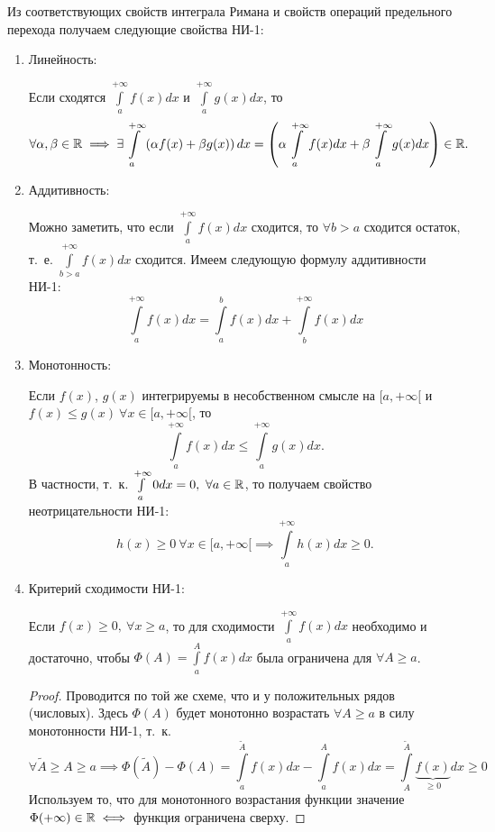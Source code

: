 \documentclass[../../main.tex]{subfiles}
\begin{document}
Из соответствующих свойств интеграла Римана и свойств операций предельного
перехода получаем следующие свойства НИ-1:
\begin{enumerate}
        \item Линейность:
        
        Если сходятся $\displaystyle\int\limits_a^{+\infty} f(x)dx$ и
        $\displaystyle\int\limits_a^{+\infty} g(x)dx$, то \[\forall \alpha, 
        \beta \in \mathbb{R}
        \implies  \exists \int\limits_a^{+\infty} \left( \alpha f(x)
        + \beta g(x) \right)dx = \left( \alpha \int\limits_a^{+\infty}
        f(x)dx + \beta \int\limits_a^{+\infty} g(x)dx \right) \in \mathbb{R}.\]
        \item Аддитивность:
        
        Можно заметить, что если $\displaystyle\int\limits_a^{+\infty} f(x)dx$ 
        сходится, то
        $\forall b>a$ сходится остаток, т.~е.
        $\displaystyle\int\limits_{b>a}^{+\infty} f(x)dx$ сходится. Имеем 
        следующую формулу
        аддитивности НИ-1:
        \[\int\limits_a^{+\infty} f(x)dx = \int\limits_a^b f(x)dx +
        \int\limits_b^{+\infty} f(x)dx \]
        \item Монотонность:
        
        Если $f(x)$, $g(x)$ интегрируемы в несобственном смысле на
        $[a, +\infty[$
        и $f(x) \leq g(x) \ {\forall x \in [a, +\infty[}$, то
        \[\int\limits_a^{+\infty} f(x)dx \leq \int\limits_a^{+\infty} g(x)dx.\]
        В частности, т.~к. $\int\limits_a^{+\infty} 0dx = 0, \ \forall a \in 
        \mathbb{R}$, то получаем свойство неотрицательности НИ-1: \[h(x) \geq 0 \ 
        \forall x \in
        [a, +\infty[ \implies \int\limits_a^{+\infty} h(x)dx \geq 0.\]
        \item Критерий сходимости НИ-1:
        
        Если $f(x) \geq 0, \ \forall x \geq a$, то для сходимости
        $ \int\limits_a^{+\infty} f(x)dx$ необходимо и достаточно, чтобы 
        $\Phi(A) =
        \int\limits_a^{A} f(x)dx$ была ограничена для $\forall A \geq a$.
        \begin{proof}
            Проводится по той же схеме, что и у положительных рядов (числовых).
            Здесь $\Phi(A)$ будет монотонно возрастать $\forall A \geq a$
            в силу монотонности НИ-1, т.~к.
            \[\forall \tilde{A} \geq A \geq a
            \implies \Phi(\tilde{A}) - \Phi(A) =
            \int\limits_a^{\tilde{A}} f(x)dx - \int\limits_a^{A} f(x)dx =
            \int\limits_A^{\tilde{A}} \underbrace{f(x)}_{\geq 0} dx \geq 0 \]
            Используем то, что для монотонного возрастания функции значение
            $\Phi (+\infty) \in \mathbb{R} \iff$ функция ограничена сверху.
        \end{proof}
\end{enumerate}
\end{document}
